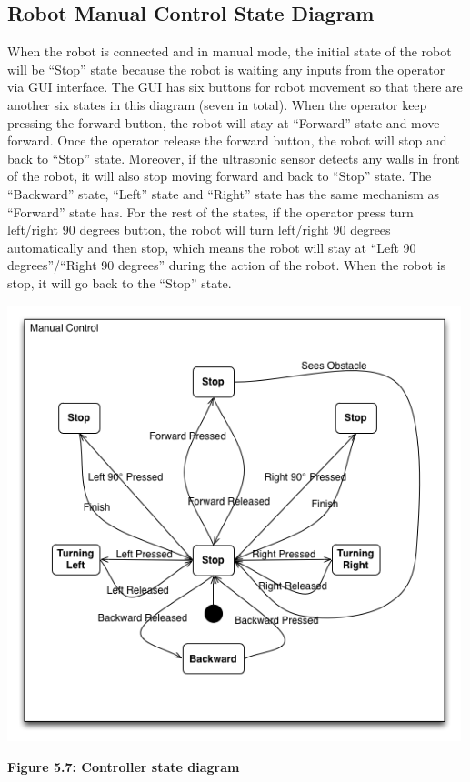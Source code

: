 \documentclass[11pt, a4paper]{report}
\begin{document}
\subsection{  Robot Manual Control State Diagram}
When the robot is connected and in manual mode, the initial state of the robot will be ``Stop'' state because the robot is waiting any inputs from the operator via GUI interface. The GUI has six buttons for robot movement so that there are another six states in this diagram (seven in total).  When the operator keep pressing the forward button, the robot will stay at ``Forward'' state and move forward. Once the operator release the forward button, the robot will stop and back to ``Stop'' state. Moreover, if the ultrasonic sensor detects any walls in front of the robot, it will also stop moving forward and back to ``Stop'' state. The ``Backward'' state, ``Left'' state and ``Right'' state has the same mechanism as ``Forward'' state has. For the rest of the states, if the operator press turn left/right 90 degrees button, the robot will turn left/right 90 degrees automatically and then stop, which means the robot will stay at ``Left 90 degrees''/``Right 90 degrees'' during the action of the robot. When the robot is stop, it will go back to the ``Stop'' state.
 \begin{center}
 \includegraphics[width=13.20cm]{RobotManualControl.png}
\end{center}
\begin{center}
\textbf {Figure 5.7: Controller state diagram} \\[0.3cm]
\end{center}
\pagebreak
\end{document}
